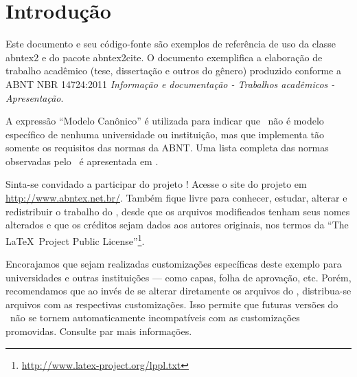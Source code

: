 \documentclass[12pt,openright,twoside,a4paper,
english,french,spanish,brazil]{abntex2}
\begin{document}
		\tableofcontents*
		\cleardoublepage
		
		
		
		\textual
		
		\chapter*[Introdução]{Introdução}
		
		Este documento e seu código-fonte são exemplos de referência de uso da classe
		\textsf{abntex2} e do pacote \textsf{abntex2cite}. O documento 
		exemplifica a elaboração de trabalho acadêmico (tese, dissertação e outros do
		gênero) produzido conforme a ABNT NBR 14724:2011 \emph{Informação e documentação
			- Trabalhos acadêmicos - Apresentação}.
		
		A expressão ``Modelo Canônico'' é utilizada para indicar que \abnTeX\ não é
		modelo específico de nenhuma universidade ou instituição, mas que implementa tão
		somente os requisitos das normas da ABNT. Uma lista completa das normas
		observadas pelo \abnTeX\ é apresentada em .
		
		Sinta-se convidado a participar do projeto \abnTeX! Acesse o site do projeto em
		\url{http://www.abntex.net.br/}. Também fique livre para conhecer,
		estudar, alterar e redistribuir o trabalho do \abnTeX, desde que os arquivos
		modificados tenham seus nomes alterados e que os créditos sejam dados aos
		autores originais, nos termos da ``The \LaTeX\ Project Public
		License''\footnote{\url{http://www.latex-project.org/lppl.txt}}.
		
		Encorajamos que sejam realizadas customizações específicas deste exemplo para
		universidades e outras instituições --- como capas, folha de aprovação, etc.
		Porém, recomendamos que ao invés de se alterar diretamente os arquivos do
		\abnTeX, distribua-se arquivos com as respectivas customizações.
		Isso permite que futuras versões do \abnTeX~não se tornem automaticamente
		incompatíveis com as customizações promovidas. Consulte
		 par mais informações.
		
\end{document}
